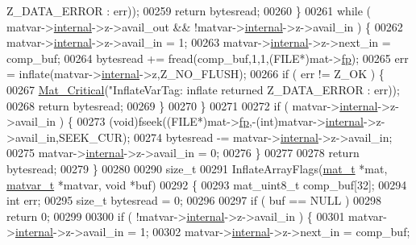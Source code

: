 \begin{DoxyCode}
{{{{{      Z\_DATA\_ERROR : err));
00259         \textcolor{keywordflow}{return} bytesread;
00260     \}
00261     \textcolor{keywordflow}{while} ( matvar->\hyperlink{group___m_a_t_a6e97e3ed9f40c49322c18561c2a94e92}{internal}->z->avail\_out && !matvar->\hyperlink{group___m_a_t_a6e97e3ed9f40c49322c18561c2a94e92}{internal}->z->avail\_in ) \{
00262         matvar->\hyperlink{group___m_a_t_a6e97e3ed9f40c49322c18561c2a94e92}{internal}->z->avail\_in = 1;
00263         matvar->\hyperlink{group___m_a_t_a6e97e3ed9f40c49322c18561c2a94e92}{internal}->z->next\_in = comp\_buf;
00264         bytesread += fread(comp\_buf,1,1,(FILE*)mat->\hyperlink{struct__mat__t_a85f562e407ca9ad4d2a6e14f839432b7}{fp});
00265         err = inflate(matvar->\hyperlink{group___m_a_t_a6e97e3ed9f40c49322c18561c2a94e92}{internal}->z,Z\_NO\_FLUSH);
00266         \textcolor{keywordflow}{if} ( err != Z\_OK ) \{
00267             \hyperlink{group__mat__util_gaf51f2bfbb5580f575e4dd79757e2b80c}{Mat\_Critical}(\textcolor{stringliteral}{"InflateVarTag: inflate returned %
      Z\_DATA\_ERROR : err));
00268             \textcolor{keywordflow}{return} bytesread;
00269         \}
00270     \}
00271 
00272     \textcolor{keywordflow}{if} ( matvar->\hyperlink{group___m_a_t_a6e97e3ed9f40c49322c18561c2a94e92}{internal}->z->avail\_in ) \{
00273         (void)fseek((FILE*)mat->\hyperlink{struct__mat__t_a85f562e407ca9ad4d2a6e14f839432b7}{fp},-(int)matvar->\hyperlink{group___m_a_t_a6e97e3ed9f40c49322c18561c2a94e92}{internal}->z->avail\_in,SEEK\_CUR);
00274         bytesread -= matvar->\hyperlink{group___m_a_t_a6e97e3ed9f40c49322c18561c2a94e92}{internal}->z->avail\_in;
00275         matvar->\hyperlink{group___m_a_t_a6e97e3ed9f40c49322c18561c2a94e92}{internal}->z->avail\_in = 0;
00276     \}
00277 
00278     \textcolor{keywordflow}{return} bytesread;
00279 \}
00280 
00290 \textcolor{keywordtype}{size\_t}
00291 InflateArrayFlags(\hyperlink{struct__mat__t}{mat\_t} *mat, \hyperlink{group___m_a_t_structmatvar__t}{matvar\_t} *matvar, \textcolor{keywordtype}{void} *buf)
00292 \{
00293     mat\_uint8\_t comp\_buf[32];
00294     \textcolor{keywordtype}{int}    err;
00295     \textcolor{keywordtype}{size\_t} bytesread = 0;
00296 
00297     \textcolor{keywordflow}{if} ( buf == NULL )
00298         \textcolor{keywordflow}{return} 0;
00299 
00300     \textcolor{keywordflow}{if} ( !matvar->\hyperlink{group___m_a_t_a6e97e3ed9f40c49322c18561c2a94e92}{internal}->z->avail\_in ) \{
00301         matvar->\hyperlink{group___m_a_t_a6e97e3ed9f40c49322c18561c2a94e92}{internal}->z->avail\_in = 1;
00302         matvar->\hyperlink{group___m_a_t_a6e97e3ed9f40c49322c18561c2a94e92}{internal}->z->next\_in = comp\_buf;
}}}}}}
\end{DoxyCode}
